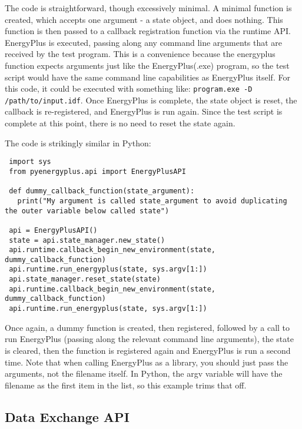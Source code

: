 The code is straightforward, though excessively minimal.
A minimal function is created, which accepts one argument - a state object, and does nothing.
This function is then passed to a callback registration function via the runtime API.
EnergyPlus is executed, passing along any command line arguments that are received by the test program.
This is a convenience because the energyplus function expects arguments just like the EnergyPlus(.exe) program, so the test script would have the same command line capabilities as EnergyPlus itself.
For this code, it could be executed with something like: \verb=program.exe -D /path/to/input.idf=.
Once EnergyPlus is complete, the state object is reset, the callback is re-registered, and EnergyPlus is run again.
Since the test script is complete at this point, there is no need to reset the state again.

The code is strikingly similar in Python:

\begin{lstlisting}
 import sys
 from pyenergyplus.api import EnergyPlusAPI

 def dummy_callback_function(state_argument):
   print("My argument is called state_argument to avoid duplicating the outer variable below called state")

 api = EnergyPlusAPI()
 state = api.state_manager.new_state()
 api.runtime.callback_begin_new_environment(state, dummy_callback_function)
 api.runtime.run_energyplus(state, sys.argv[1:])
 api.state_manager.reset_state(state)
 api.runtime.callback_begin_new_environment(state, dummy_callback_function)
 api.runtime.run_energyplus(state, sys.argv[1:])
\end{lstlisting}

Once again, a dummy function is created, then registered, followed by a call to run EnergyPlus (passing along the relevant command line arguments), the state is cleared, then the function is registered again and EnergyPlus is run a second time.
Note that when calling EnergyPlus as a library, you should just pass the arguments, not the filename itself.
In Python, the argv variable will have the filename as the first item in the list, so this example trims that off.

\subsection{Data Exchange API}\label{subsec:data-exchange-api}

